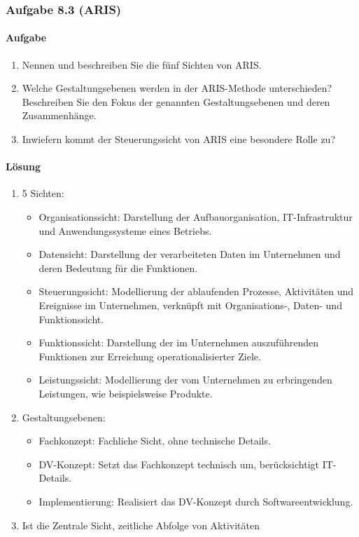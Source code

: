 \subsubsection*{Aufgabe 8.3 (ARIS)}
    \paragraph*{Aufgabe}
        \begin{enumerate}[label=\alph*)]
            \item Nennen und beschreiben Sie die fünf Sichten von ARIS.
            \item Welche Gestaltungsebenen werden in der ARIS-Methode unterschieden? Beschreiben Sie den Fokus der genannten Gestaltungsebenen und deren Zusammenhänge.
            \item Inwiefern kommt der Steuerungssicht von ARIS eine besondere Rolle zu?
        \end{enumerate}
    \paragraph*{Lösung}
        \begin{enumerate}[label=\alph*)]
            \item 5 Sichten:
                \begin{itemize}
                    \item Organisationssicht: Darstellung der Aufbauorganisation, IT-Infrastruktur und Anwendungssysteme eines Betriebs.
                    \item Datensicht: Darstellung der verarbeiteten Daten im Unternehmen und deren Bedeutung für die Funktionen.
                    \item Steuerungssicht: Modellierung der ablaufenden Prozesse, Aktivitäten und Ereignisse im Unternehmen, verknüpft mit Organisations-, Daten- und Funktionssicht.
                    \item Funktionssicht: Darstellung der im Unternehmen auszuführenden Funktionen zur Erreichung operationalisierter Ziele.
                    \item Leistungssicht: Modellierung der vom Unternehmen zu erbringenden Leistungen, wie beispielsweise Produkte.
                \end{itemize}
            \item Gestaltungsebenen:
                \begin{itemize}
                    \item Fachkonzept: Fachliche Sicht, ohne technische Details.
                    \item DV-Konzept: Setzt das Fachkonzept technisch um, berücksichtigt IT-Details.
                    \item Implementierung: Realisiert das DV-Konzept durch Softwareentwicklung.
                \end{itemize}
            \item Ist die Zentrale Sicht, zeitliche Abfolge von Aktivitäten
        \end{enumerate}

